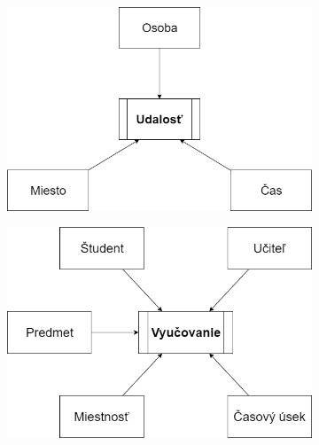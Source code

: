 \newpage
\begin{figure}[ht]
\centering
\begin{subfigure}{.45\textwidth}
  \centering
  \includegraphics[width=.9\linewidth]{img/koncepty.png}
  \caption{\label{fig:concepts1}}
\end{subfigure}
\begin{subfigure}{.45\textwidth}
  \centering
  \includegraphics[width=.9\linewidth]{img/koncepty2.png}
  \caption{\label{fig:concepts2}}
\end{subfigure}
\begin{subfigure}{.45\textwidth}
  \centering

\end{subfigure}
\end{figure}
